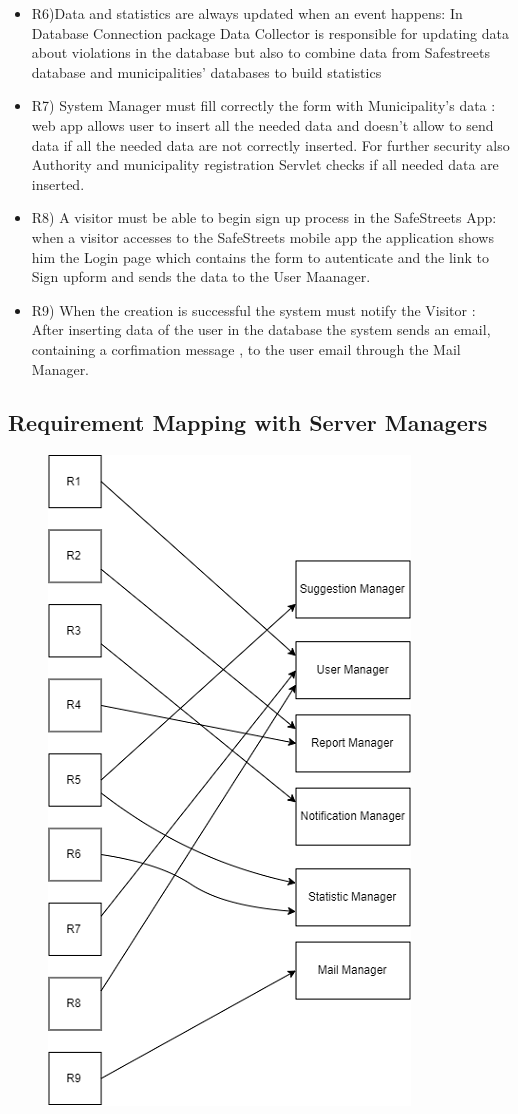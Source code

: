 \begin{itemize}
 \item R6)Data and statistics are always updated when an event happens: In Database Connection package Data Collector is responsible for updating data about violations in the database but also to combine data from Safestreets database and municipalities' databases to build statistics
\item R7) System Manager must fill correctly the form with Municipality’s data : web app allows user to insert all the needed data and doesn't allow to send data if all the needed data are not correctly inserted. For further security also Authority and municipality registration Servlet checks if all needed data are inserted.
 \item R8) A visitor must be able to begin sign up process in the SafeStreets App: when a visitor accesses to the SafeStreets mobile app the application shows him the Login page which contains the form to autenticate and the link to Sign upform and sends the data to the User Maanager.
 \item R9) When the creation is successful the system must notify the Visitor : After inserting data of the user in the database the system sends an email, containing a corfimation message , to the user email through the Mail Manager.

\end{itemize}
\subsection{Requirement Mapping with Server Managers}

\begin{figure}[H]
\centering
\includegraphics{Images/ReqMapping.png}
\end{figure}
